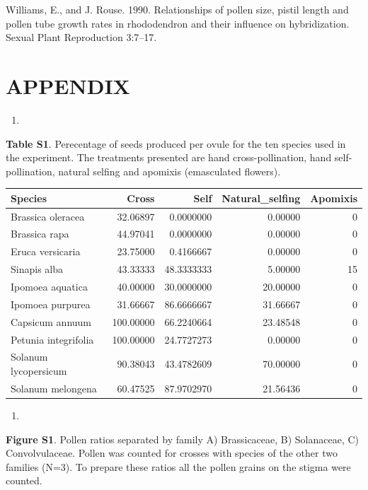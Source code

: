 \documentclass[11pt,a4paper]{article}
\begin{document}
\hypertarget{ref-williams1990}{}
Williams, E., and J. Rouse. 1990. Relationships of pollen size, pistil
length and pollen tube growth rates in rhododendron and their influence
on hybridization. Sexual Plant Reproduction 3:7--17.

\section{APPENDIX}\label{appendix}

\begin{enumerate}
\def\labelenumi{\arabic{enumi}.}
\item
\end{enumerate}

\textbf{Table S1}. Perecentage of seeds produced per ovule for the ten
species used in the experiment. The treatments presented are hand
cross-pollination, hand self-pollination, natural selfing and apomixis
(emasculated flowers).

\begin{longtable}[]{@{}lrrrr@{}}
\toprule
Species & Cross & Self & Natural\_selfing & Apomixis\tabularnewline
\midrule
\endhead
Brassica oleracea & 32.06897 & 0.0000000 & 0.00000 & 0\tabularnewline
Brassica rapa & 44.97041 & 0.0000000 & 0.00000 & 0\tabularnewline
Eruca versicaria & 23.75000 & 0.4166667 & 0.00000 & 0\tabularnewline
Sinapis alba & 43.33333 & 48.3333333 & 5.00000 & 15\tabularnewline
Ipomoea aquatica & 40.00000 & 30.0000000 & 20.00000 & 0\tabularnewline
Ipomoea purpurea & 31.66667 & 86.6666667 & 31.66667 & 0\tabularnewline
Capsicum annuum & 100.00000 & 66.2240664 & 23.48548 & 0\tabularnewline
Petunia integrifolia & 100.00000 & 24.7727273 & 0.00000 &
0\tabularnewline
Solanum lycopersicum & 90.38043 & 43.4782609 & 70.00000 &
0\tabularnewline
Solanum melongena & 60.47525 & 87.9702970 & 21.56436 & 0\tabularnewline
\bottomrule
\end{longtable}

\begin{enumerate}
\def\labelenumi{\arabic{enumi}.}
\setcounter{enumi}{1}
\item
\end{enumerate}

\textbf{Figure S1}. Pollen ratios separated by family A) Brassicaceae,
B) Solanaceae, C) Convolvulaceae. Pollen was counted for crosses with
species of the other two families (N=3). To prepare these ratios all the
pollen grains on the stigma were counted.
\end{document}
